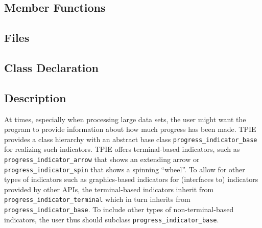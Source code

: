 \subsection{Member Functions}
   \btabb
   \etabb

\clearpage

\subsection{Files}
\btabb
    {}
    {}
\etabb

\subsection{Class Declaration}

\btabb
    {}
    {}
\etabb

\subsection{Description}

At times, especially when processing large data sets, the user might
want the program to provide information about how much progress has
been made. TPIE provides a class hierarchy with an abstract base class
\lstinline|progress_indicator_base| for realizing such
indicators. TPIE offers terminal-based indicators, such as
\lstinline|progress_indicator_arrow| that shows an extending arrow or
\lstinline|progress_indicator_spin| that shows a spinning
``wheel''. To allow for other types of indicators such as
graphics-based indicators for (interfaces to) indicators provided by
other APIs, the terminal-based indicators inherit from
\lstinline|progress_indicator_terminal| which in turn inherits from
\lstinline|progress_indicator_base|. To include other types of
non-terminal-based indicators, the user thus should subclass
\lstinline|progress_indicator_base|. 

